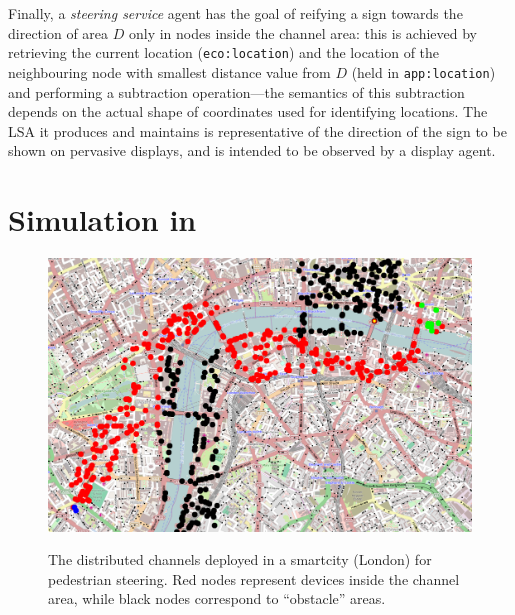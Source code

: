 \documentclass[12pt,a4paper,twoside,openright]{book}
\begin{document}
Finally, a \emph{steering service} agent has the goal of reifying a sign towards the direction of area $D$ only in nodes inside the channel area: this is achieved by retrieving the current location (\texttt{eco:location}) and the location  of the neighbouring node with smallest distance value from $D$ (held in \texttt{app:location}) and performing a subtraction operation---the semantics of this subtraction depends on the actual shape of coordinates used for identifying locations.
%
The LSA it produces and maintains is representative of the direction of the sign to be shown on pervasive displays, and is intended to be observed by a display agent.

\section{Simulation in \alchemist{}}
\label{simulation-channel}

\begin{figure}
\begin{center}{\includegraphics[width=\textwidth]{img/london-channel}}\end{center}
\caption[Channel deployed in London]{The distributed channels deployed in a smartcity (London) for pedestrian steering. Red nodes represent devices inside the channel area, while black nodes correspond to ``obstacle'' areas.}
\label{f:london}
\end{figure}
\end{document}
